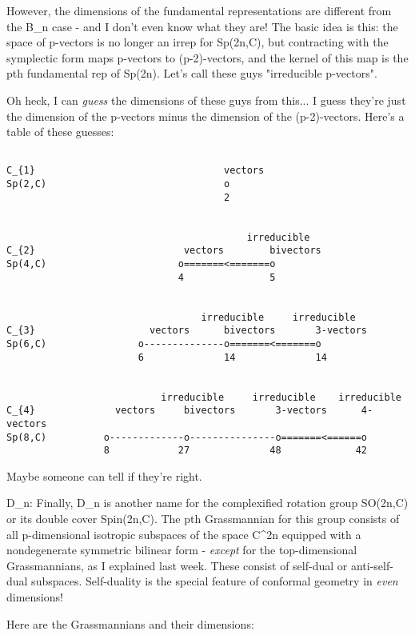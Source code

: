 However, the dimensions of the fundamental representations are different
from the B_{n} case - and I don't even know what they are!  The
basic idea is this: the space of p-vectors is no longer an irrep for
Sp(2n,C), but contracting with the symplectic form maps p-vectors to
(p-2)-vectors, and the kernel of this map is the pth fundamental rep of
Sp(2n).  Let's call these guys "irreducible p-vectors".

Oh heck, I can \emph{guess} the dimensions of these guys from this... I guess
they're just the dimension of the p-vectors minus the dimension of the
(p-2)-vectors.  Here's a table of these guesses:



\begin{verbatim}

C_{1}                                 vectors
Sp(2,C)                               o
                                      2

     
                                          irreducible 
C_{2}                          vectors        bivectors
Sp(4,C)                       o=======<=======o
                              4               5


                                  irreducible     irreducible
C_{3}                    vectors      bivectors       3-vectors
Sp(6,C)                o--------------o=======<=======o
                       6              14              14


                           irreducible     irreducible    irreducible
C_{4}              vectors     bivectors       3-vectors      4-vectors
Sp(8,C)          o-------------o---------------o=======<======o
                 8            27              48             42
\end{verbatim}
    
Maybe someone can tell if they're right.  

D_{n}: Finally, D_{n} is another name for the complexified rotation group
SO(2n,C) or its double cover Spin(2n,C).  The pth Grassmannian for
this group consists of all p-dimensional isotropic subspaces of the
space C^{2n} equipped with a nondegenerate symmetric bilinear form -
\emph{except} for the top-dimensional Grassmannians, as I explained
last week.  These consist of self-dual or anti-self-dual subspaces.
Self-duality is the special feature of conformal geometry in \emph{even}
dimensions!

Here are the Grassmannians and their dimensions:


